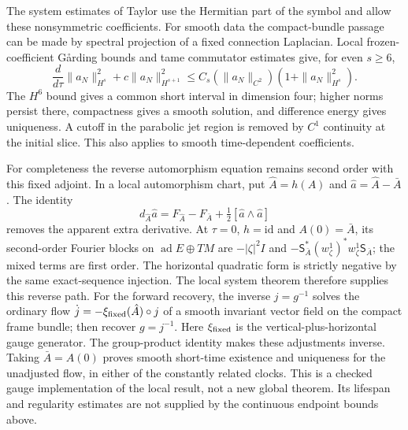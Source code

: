 \documentclass[11pt]{article}
\numberwithin{equation}{section}
\theoremstyle{definition}
\theoremstyle{remark}
\begin{document}
The system estimates of Taylor
\cite[Chapter 7, Propositions 7.3.A--B]{Taylor1991Nonlinear}
use the Hermitian part of the symbol and allow these nonsymmetric
coefficients.  For smooth data the compact-bundle passage can be
made by spectral projection of a fixed connection Laplacian.
Local frozen-coefficient G{\aa}rding bounds and tame commutator
estimates give, for even $s\ge6$,
\[
 \frac{d}{d\tau}\|a_N\|_{H^s}^2+c\|a_N\|_{H^{s+1}}^2
 \le C_s(\|a_N\|_{C^2})(1+\|a_N\|_{H^s}^2).
\]
The $H^6$ bound gives a common short interval in dimension four;
higher norms persist there, compactness gives a smooth solution,
and difference energy gives uniqueness.  A cutoff in the
parabolic jet region is removed by $C^1$ continuity at the initial
slice.  This also applies to smooth time-dependent coefficients.

For completeness the reverse automorphism equation remains
second order with this fixed adjoint.  In a local automorphism
chart, put $\hat A=h(A)$ and $\hat a=\hat A-\bar A$.  The identity
\[
 d_{\hat A}\hat a=F_{\hat A}-F_{\bar A}
                         +\tfrac12[\hat a\wedge\hat a]
\]
removes the apparent extra derivative.  At $\tau=0$, $h=\mathrm{id}$
and $A(0)=\bar A$, its
second-order Fourier blocks on $\operatorname{ad}E\oplus TM$ are
$-|\zeta|^2I$ and
$-\mathsf S_{\bar A}^*(w_\zeta^1)^*w_\zeta^1\mathsf S_{\bar A}$;
the mixed terms are first order.  The horizontal quadratic form
is strictly negative by the same exact-sequence injection.
The local system theorem therefore supplies this reverse path.
For the forward recovery, the inverse $j=g^{-1}$ solves the ordinary
flow $\dot j=-\xi_{\rm fixed}(\hat A)\circ j$ of a smooth invariant
vector field on the compact frame bundle; then recover $g=j^{-1}$.
Here $\xi_{\rm fixed}$ is the vertical-plus-horizontal gauge generator.
The group-product
identity makes these adjustments inverse.  Taking $\bar A=A(0)$
proves smooth short-time existence and uniqueness for the
unadjusted flow, in either of the constantly related clocks.
This is a checked gauge implementation of the local result, not
a new global theorem.  Its lifespan and regularity estimates
are not supplied by the continuous endpoint bounds above.
\end{document}
